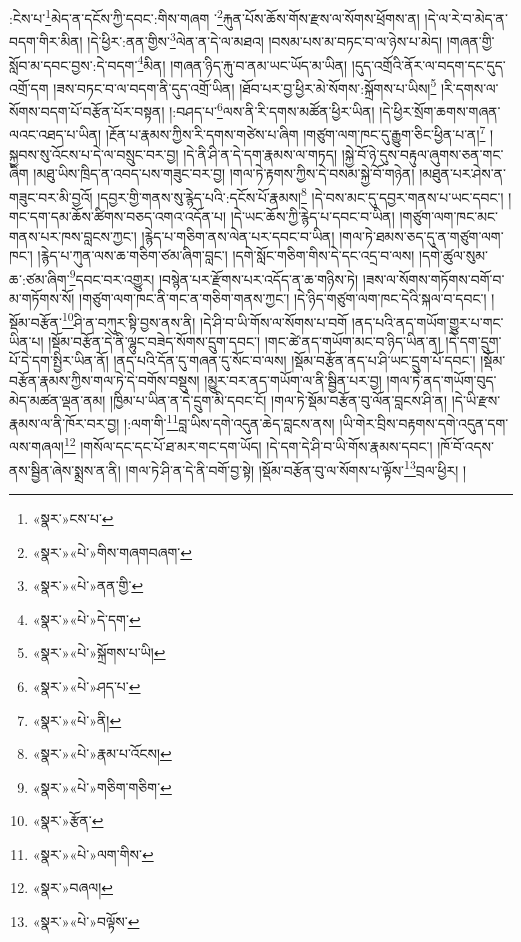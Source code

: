 :ངེས་པ་\footnote{«སྣར་»ངས་པ་}མེད་ན་དངོས་ཀྱི་དབང་:གིས་གཞག ་\footnote{«སྣར་»«པེ་»གིས་གཞགབཞག་}རྐུན་པོས་ཆོས་གོས་རྫས་ལ་སོགས་ཕྲོགས་ན། །དེ་ལ་རེ་བ་མེད་ན་བདག་གིར་མིན། །དེ་ཕྱིར་:ནན་གྱིས་\footnote{«སྣར་»«པེ་»ནན་གྱི་}ལེན་ན་དེ་ལ་མཐའ། །བསམ་པས་མ་བཏང་བ་ལ་ཉེས་པ་མེད། །གཞན་གྱི་སློབ་མ་དབང་བྱས་:དེ་བདག་\footnote{«སྣར་»«པེ་»དེ་དག་}མིན། །གཞན་ཉིད་རྐུ་བ་ནམ་ཡང་ཡོད་མ་ཡིན། །དུད་འགྲོའི་ནོར་ལ་བདག་དང་དུད་འགྲོ་དག །ཟས་བཏང་བ་ལ་བདག་ནི་དུད་འགྲོ་ཡིན། །ཐོབ་པར་བྱ་ཕྱིར་མེ་སོགས་:སྐྲོགས་པ་ཡིས།\footnote{«སྣར་»«པེ་»སྐྲོགས་པ་ཡི།} །རི་དགས་ལ་སོགས་བདག་པོ་བརྩོན་པོར་བསྟན། །:བཤད་པ་\footnote{«སྣར་»«པེ་»ཤད་པ་}ལས་ནི་རི་དགས་མཚོན་ཕྱིར་ཡིན། །དེ་ཕྱིར་སྲོག་ཆགས་གཞན་ལའང་འཐད་པ་ཡིན། །རྔོན་པ་རྣམས་ཀྱིས་རི་དགས་གཙེས་པ་ཞིག །གཙུག་ལག་ཁང་དུ་རྒྱུག་ཅིང་ཕྱིན་པ་ན།\footnote{«སྣར་»«པེ་»ནི།} །སྐྱབས་སུ་འོངས་པ་དེ་ལ་བསྲུང་བར་བྱ། །དེ་ནི་ཤི་ན་དེ་དག་རྣམས་ལ་གཏད། །སྐྱེ་བོ་ཉེ་དུས་བརྟུལ་ཞུགས་ཅན་གང་ཞིག །མཐུ་ཡིས་ཁྲིད་ན་འབད་པས་གཟུང་བར་བྱ། །གལ་ཏེ་རྟགས་ཀྱིས་དེ་བསམ་སྐྱེ་བོ་གཉེན། །མཐུན་པར་ཤེས་ན་གཟུང་བར་མི་བྱའོ། །དབྱར་གྱི་གནས་སུ་རྙེད་པའི་:དངོས་པོ་རྣམས།\footnote{«སྣར་»«པེ་»རྣམ་པ་འོངས།} །དེ་བས་མང་དུ་དབྱར་གནས་པ་ཡང་དབང་། །གང་དག་དམ་ཆོས་ཚིགས་བཅད་འགའ་འདོན་པ། །དེ་ཡང་ཆོས་ཀྱི་རྙེད་པ་དབང་བ་ཡིན། །གཙུག་ལག་ཁང་མང་གནས་པར་ཁས་བླངས་ཀྱང་། །རྙེད་པ་གཅིག་ནས་ལེན་པར་དབང་བ་ཡིན། །གལ་ཏེ་ཐམས་ཅད་དུ་ན་གཙུག་ལག་ཁང་། །རྙེད་པ་ཀུན་ལས་ཆ་གཅིག་ཙམ་ཞིག་བླང་། །དགེ་སློང་གཅིག་གིས་དེ་དང་འདྲ་བ་ལས། །དགེ་ཚུལ་སུམ་ཆ་:ཙམ་ཞིག་\footnote{«སྣར་»«པེ་»གཅིག་གཅིག་}དབང་བར་འགྱུར། །བསྙེན་པར་རྫོགས་པར་འདོད་ན་ཆ་གཉིས་ཏེ། །ཟས་ལ་སོགས་གཏོགས་བགོ་བ་མ་གཏོགས་སོ། །གཙུག་ལག་ཁང་ནི་གང་ན་གཅིག་གནས་ཀྱང་། །དེ་ཉིད་གཙུག་ལག་ཁང་དེའི་སྐལ་བ་དབང་། །སྡོམ་བརྩོན་\footnote{«སྣར་»རྩོན་}ཤི་ན་བཀུར་སྟི་བྱས་ནས་ནི། །དེ་ཤི་བ་ཡི་གོས་ལ་སོགས་པ་བགོ །ནད་པའི་ནད་གཡོག་གྱུར་པ་གང་ཡིན་པ། །སྡོམ་བརྩོན་དེ་ནི་ལྷུང་བཟེད་སོགས་དྲུག་དབང་། །གང་ཚེ་ནད་གཡོག་མང་བ་ཉིད་ཡིན་ན། །དེ་དག་དྲུག་པོ་དེ་དག་སྤྱིར་ཡིན་ནོ། །ནད་པའི་དོན་དུ་གཞན་དུ་སོང་བ་ལས། །སྡོམ་བརྩོན་ནད་པ་ཤི་ཡང་དྲུག་པོ་དབང་། །སྡོམ་བརྩོན་རྣམས་ཀྱིས་གལ་ཏེ་དེ་བགོས་བསྡུས། །མྱུར་བར་ནད་གཡོག་ལ་ནི་སྦྱིན་པར་བྱ། །གལ་ཏེ་ནད་གཡོག་བུད་མེད་མཚན་ལྡན་ནམ། །ཁྱིམ་པ་ཡིན་ན་དེ་དྲུག་མི་དབང་ངོ། །གལ་ཏེ་སྡོམ་བརྩོན་བུ་ལོན་བླངས་ཤི་ན། །དེ་ཡི་རྫས་རྣམས་ལ་ནི་ཁོར་བར་བྱ། །:ལག་གི་\footnote{«སྣར་»«པེ་»ལག་གིས་}བླ་ཡིས་དགེ་འདུན་ཆེད་བླངས་ནས། །ཡི་གེར་བྲིས་བརྟགས་དགེ་འདུན་དག་ལས་གཞལ།\footnote{«སྣར་»བཞལ།} །གསོལ་དང་དང་པོ་ཐ་མར་གང་དག་ཡོད། །དེ་དག་དེ་ཤི་བ་ཡི་གོས་རྣམས་དབང་། །ཁོ་བོ་འདས་ནས་སྦྱིན་ཞེས་སྨྲས་ན་ནི། །གལ་ཏེ་ཤི་ན་དེ་ནི་བགོ་བྱ་སྟེ། །སྡོམ་བརྩོན་བུ་ལ་སོགས་པ་ལྟོས་\footnote{«སྣར་»«པེ་»བལྟོས་}བྲལ་ཕྱིར། །
